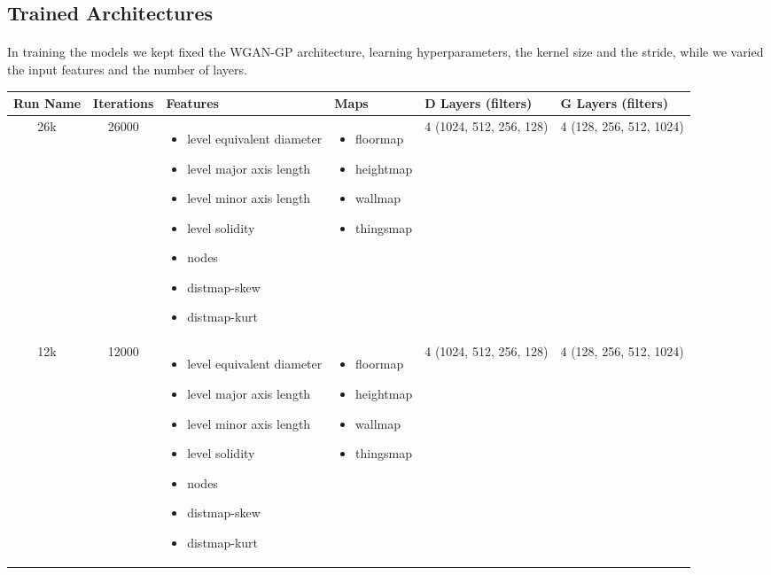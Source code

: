 \newpage
\subsection{Trained Architectures}
\paragraph{} In training the models we kept fixed the WGAN-GP architecture, learning hyperparameters, the kernel size and the stride, while we varied the input features and the number of layers. 

\begin{table}[h!]
	\begin{tabularx}{\textwidth}{| c | c | X | X | X | X |}
		\hline
		\textbf{Run Name} & \textbf{Iterations} & \textbf{Features} & \textbf{Maps} & \textbf{D Layers (filters)} & \textbf{G Layers (filters)} \\
		\hline
		26k & 26000 & 
		\begin{itemize}
			\raggedright
			\small
			\item[] level equivalent diameter
			\item[] level major axis length
			\item[] level minor axis length
			\item[] level solidity
			\item[] nodes
			\item[] distmap-skew
			\item[] distmap-kurt
		\end{itemize}
		 & 
		 	\begin{itemize}
		 	\raggedright
		 	\small
		 	\item[] floormap
		 	\item[] heightmap
		 	\item[] wallmap
		 	\item[] thingsmap
		 \end{itemize}
		 & 4 (1024, 512, 256, 128) & 4 (128, 256, 512, 1024)\\
		
		\hline
		
		12k & 12000 & 
		\begin{itemize}
			\raggedright
			\small
			\item[] level equivalent diameter
			\item[] level major axis length
			\item[] level minor axis length
			\item[] level solidity
			\item[] nodes
			\item[] distmap-skew
			\item[] distmap-kurt
		\end{itemize}
		& 
		\begin{itemize}
			\raggedright
			\small
			\item[] floormap
			\item[] heightmap
			\item[] wallmap
			\item[] thingsmap
		\end{itemize}
		& 4 (1024, 512, 256, 128) & 4 (128, 256, 512, 1024)\\
		

\end{tabularx}
\end{table}
